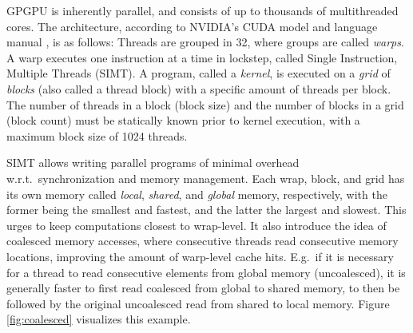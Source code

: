 GPGPU is inherently parallel, and consists of up to thousands of multithreaded
cores. The architecture, according to NVIDIA's CUDA model and language manual
\cite{cudaguide}, is as follows: Threads are grouped in 32, where groups are
called \textit{warps}. A warp executes one instruction at a time in lockstep,
called Single Instruction, Multiple Threads (SIMT). A program, called a
\textit{kernel}, is executed on a \textit{grid} of \textit{blocks} (also called
a thread block) with a specific amount of threads per block. The number of
threads in a block (block size) and the number of blocks in a grid (block count)
must be statically known prior to kernel execution, with a maximum block size of
1024 threads.

SIMT allows writing parallel programs of minimal overhead w.r.t.\
synchronization and memory management. Each wrap, block, and grid has its own
memory called \textit{local}, \textit{shared}, and \textit{global} memory,
respectively, with the former being the smallest and fastest, and the latter the
largest and slowest. This urges to keep computations closest to wrap-level. It
also introduce the idea of coalesced memory accesses, where consecutive threads
read consecutive memory locations, improving the amount of warp-level cache
hits. E.g.\ if it is necessary for a thread to read consecutive elements from
global memory (uncoalesced), it is generally faster to first read coalesced from
global to shared memory, to then be followed by the original uncoalesced read
from shared to local memory. Figure \ref{fig:coalesced} visualizes this example.

